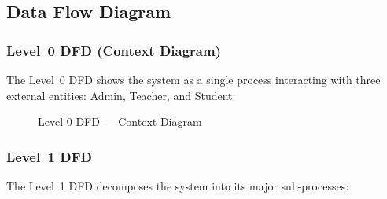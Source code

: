 \subsection{Data Flow Diagram}

\subsubsection{Level~0 DFD (Context Diagram)}

The Level~0 DFD shows the system as a single process interacting with three external entities: Admin, Teacher, and Student.

\begin{figure}[H]
\centering
{}
\caption{Level 0 DFD --- Context Diagram}
\label{fig:dfd_level0}
\end{figure}

\subsubsection{Level~1 DFD}

The Level~1 DFD decomposes the system into its major sub-processes:

